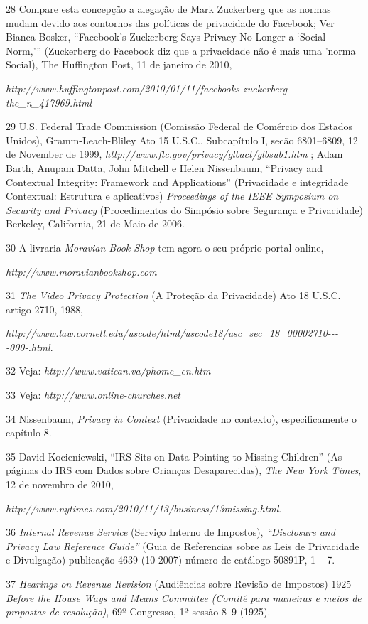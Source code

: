 28 Compare esta concepção a alegação de Mark Zuckerberg que as normas
mudam devido aos contornos das políticas de privacidade do Facebook; Ver
Bianca Bosker, ``Facebook's Zuckerberg Says Privacy No Longer a `Social
Norm,''' (Zuckerberg do Facebook diz que a privacidade não é mais uma
'norma Social), The Huffington Post, 11 de janeiro de 2010,

\emph{http://www.huffingtonpost.com/2010/01/11/facebooks-zuckerberg-the\_n\_417969.html}

29 U.S. Federal Trade Commission (Comissão Federal de Comércio dos
Estados Unidos), Gramm-Leach-Bliley Ato 15 U.S.C., Subcapítulo I, secão
6801--6809, 12 de November de 1999,
\emph{http://www.ftc.gov/privacy/glbact/glbsub1.htm}
; Adam Barth, Anupam Datta, John Mitchell e Helen Nissenbaum, ``Privacy
and Contextual Integrity: Framework and Applications'' (Privacidade e
integridade Contextual: Estrutura e aplicativos) \emph{Proceedings of
the IEEE Symposium on Security and Privacy} (Procedimentos do Simpósio
sobre Segurança e Privacidade) Berkeley, California, 21 de Maio de 2006.

30 A livraria \emph{Moravian Book Shop} tem agora o seu próprio portal
online,

\emph{http://www.moravianbookshop.com}

31 \emph{The Video Privacy Protection} (A Proteção da Privacidade) Ato
18 U.S.C. artigo 2710, 1988,

\emph{http://www.law.cornell.edu/uscode/html/uscode18/usc\_sec\_18\_00002710-\/-\/-\/-000-.html}.

32 Veja:
\emph{http://www.vatican.va/phome\_en.htm}

33 Veja:
\emph{http://www.online-churches.net}

34 Nissenbaum, \emph{Privacy in Context} (Privacidade no contexto),
especificamente o capítulo 8.

35 David Kocieniewski, ``IRS Sits on Data Pointing to Missing Children''
(As páginas do IRS com Dados sobre Crianças Desaparecidas), \emph{The
New York Times}, 12 de novembro de 2010,

\emph{http://www.nytimes.com/2010/11/13/business/13missing.html}.

36 \emph{Internal Revenue Service} (Serviço Interno de Impostos),
\emph{``Disclosure and Privacy Law Reference Guide''} (Guia de
Referencias sobre as Leis de Privacidade e Divulgação) publicação 4639
(10-2007) número de catálogo 50891P, 1 -- 7.

37 \emph{Hearings on Revenue Revision} (Audiências sobre Revisão de
Impostos) 1925 \emph{Before the House Ways and Means Committee (Comitê
para maneiras e meios de propostas de resolução)}, 69º Congresso, 1ª
sessão 8--9 (1925).

